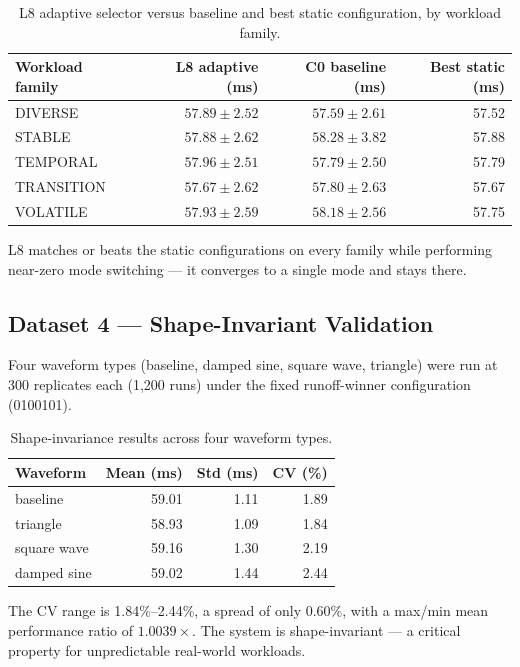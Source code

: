 \begin{table}[ht]
\centering
\small
\begin{tabular}{lrrr}
\toprule
Workload family & L8 adaptive (ms) & C0 baseline (ms) & Best static (ms) \\
\midrule
DIVERSE    & $57.89 \pm 2.52$ & $57.59 \pm 2.61$ & 57.52 \\
STABLE     & $57.88 \pm 2.62$ & $58.28 \pm 3.82$ & 57.88 \\
TEMPORAL   & $57.96 \pm 2.51$ & $57.79 \pm 2.50$ & 57.79 \\
TRANSITION & $57.67 \pm 2.62$ & $57.80 \pm 2.63$ & 57.67 \\
VOLATILE   & $57.93 \pm 2.59$ & $58.18 \pm 2.56$ & 57.75 \\
\bottomrule
\end{tabular}
\caption{L8 adaptive selector versus baseline and best static configuration, by workload family.}
\end{table}

L8 matches or beats the static configurations on every family while performing
near-zero mode switching --- it converges to a single mode and stays there.

\subsection{Dataset 4 --- Shape-Invariant Validation}

Four waveform types (baseline, damped sine, square wave, triangle) were run at
300 replicates each (1{,}200 runs) under the fixed runoff-winner configuration
(0100101).

\begin{table}[ht]
\centering
\small
\begin{tabular}{lrrr}
\toprule
Waveform & Mean (ms) & Std (ms) & CV (\%) \\
\midrule
baseline    & 59.01 & 1.11 & 1.89 \\
triangle    & 58.93 & 1.09 & 1.84 \\
square wave & 59.16 & 1.30 & 2.19 \\
damped sine & 59.02 & 1.44 & 2.44 \\
\bottomrule
\end{tabular}
\caption{Shape-invariance results across four waveform types.}
\end{table}

The CV range is 1.84\%--2.44\%, a spread of only 0.60\%, with a max/min mean
performance ratio of $1.0039\times$. The system is shape-invariant --- a
critical property for unpredictable real-world workloads.

